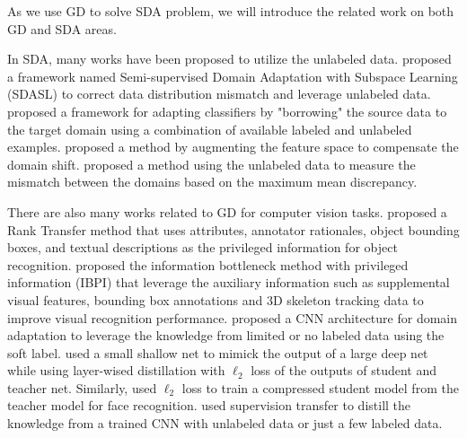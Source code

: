 As we use GD to solve SDA problem, we will introduce the related work on both GD and SDA areas.

In SDA, many works have been proposed to utilize the unlabeled data.  \cite{yao2015semi} proposed a framework named Semi-supervised Domain Adaptation with Subspace Learning (SDASL) to correct data distribution mismatch and leverage unlabeled data. \cite{Donahue_2013_CVPR} proposed a framework for adapting classifiers by "borrowing" the source data to the target domain using a combination of available labeled and unlabeled examples. \cite{daume2010frustratingly} proposed a method by augmenting the feature space to compensate the domain shift. \cite{duan2012visual} proposed a method using the unlabeled data to measure the mismatch between the domains based on the maximum mean discrepancy.

There are also many works related to GD for computer vision tasks. \cite{Sharmanska_2013_ICCV} proposed a Rank Transfer method that uses attributes, annotator
rationales, object bounding boxes, and textual descriptions as the privileged information for object recognition. \cite{Motiian_2016_CVPR} proposed {the information bottleneck method with privileged information (IBPI)} that leverage the auxiliary information such as supplemental visual features, bounding box annotations and 3D skeleton tracking data to improve visual recognition performance. \cite{Tzeng_2015_ICCV} proposed a CNN architecture for domain adaptation to leverage the knowledge from limited or no labeled data using the soft label. \cite{urban2016deep} used a small shallow net to mimick the output of a large deep net while using layer-wised distillation with $\ell_2$ loss of the outputs of student and teacher net. Similarly, \cite{luo2016face} used $\ell_2$ loss to train a compressed student model from the teacher model for face recognition. \cite{Gupta_2016_CVPR} used supervision transfer to distill the knowledge from a trained CNN with unlabeled data or just a few labeled data.